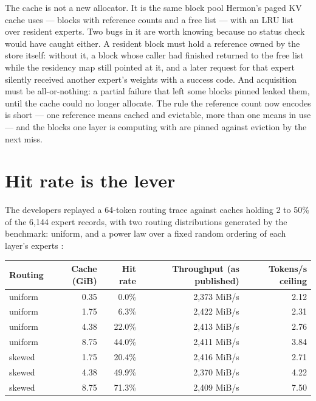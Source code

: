 The cache is not a new allocator. It is the same block pool Hermon's paged KV
cache uses --- blocks with reference counts and a free list --- with an LRU list
over resident experts. Two bugs in it are worth knowing because no status check
would have caught either. A resident block must hold a reference owned by the
store itself: without it, a block whose caller had finished returned to the
free list while the residency map still pointed at it, and a later request for
that expert silently received another expert's weights with a success code.
And acquisition must be all-or-nothing: a partial failure that left some blocks
pinned leaked them, until the cache could no longer allocate. The rule the
reference count now encodes is short --- one reference means cached and
evictable, more than one means in use --- and the blocks one layer is computing
with are pinned against eviction by the next miss.

\section{Hit rate is the lever}

The developers replayed a 64-token routing trace against caches holding 2 to
50\% of the 6,144 expert records, with two routing distributions generated by
the benchmark: uniform, and a power law over a fixed random ordering of each
layer's experts \cite[section~K6.1]{hermon2026kerneldesign}:

\begin{center}
\small
\begin{tabular}{lrrrr}
\toprule
Routing & Cache (GiB) & Hit rate & Throughput (as published) & Tokens/s ceiling \\
\midrule
uniform & 0.35 & 0.0\% & 2,373 MiB/s & 2.12 \\
uniform & 1.75 & 6.3\% & 2,422 MiB/s & 2.31 \\
uniform & 4.38 & 22.0\% & 2,413 MiB/s & 2.76 \\
uniform & 8.75 & 44.0\% & 2,411 MiB/s & 3.84 \\
skewed & 1.75 & 20.4\% & 2,416 MiB/s & 2.71 \\
skewed & 4.38 & 49.9\% & 2,370 MiB/s & 4.22 \\
skewed & 8.75 & 71.3\% & 2,409 MiB/s & 7.50 \\
\bottomrule
\end{tabular}
\end{center}

